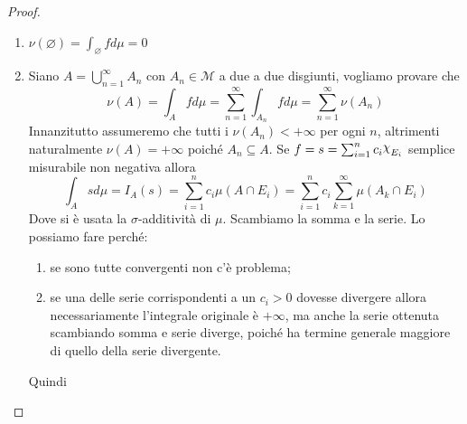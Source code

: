 \begin{proof}
    \begin{enumerate}[label = \arabic*.]
        \item \(\nu(\varnothing) = \int_{\varnothing} f d\mu = 0\)
        \item Siano \(A = \bigcup_{n=1}^{\infty} A_{n} \) con \(A_{n} \in
            \mathcal{M}\) a due a due disgiunti, vogliamo provare che 
            \[
                \nu(A) = \int_{A} f d\mu = \sum_{n=1}^{\infty} \int_{A_{n}} f
                d\mu = \sum_{n=1}^{\infty} \nu(A_{n})
            \]
            Innanzitutto assumeremo che tutti i \(\nu(A_{n}) < +\infty\) per
            ogni \(n\), altrimenti naturalmente \(\nu(A) = +\infty\) poiché
            \(A_{n} \subseteq A \).
            Se \(f = s = \sum_{i=1}^{n} c_{i}\rchi_{E_{i}} \) semplice misurabile non negativa allora
            \[
                \int_A s d\mu = I_A(s) = \sum_{i=1}^{n} c_{i} \mu(A \cap E_{i}) = \sum_{i=1}^{n}
                c_{i} \sum_{k=1}^{\infty} \mu(A_k \cap E_{i})
            \]
            Dove si è usata la \(\sigma\)-additività di \(\mu\). Scambiamo
            la somma e la serie. Lo possiamo fare perché:
            
            \begin{enumerate}
                \item se sono tutte convergenti non c'è problema;
                \item se una delle serie corrispondenti a un \(c_{i} >0\)
                    dovesse divergere allora necessariamente l'integrale
                    originale è \(+\infty\), ma anche la serie ottenuta
                    scambiando somma e serie diverge, poiché ha termine generale
                    maggiore di quello della serie divergente.
            \end{enumerate}

            Quindi 


\end{enumerate}
\end{proof}
